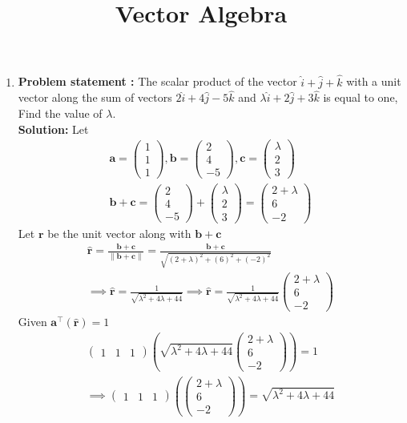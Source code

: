 \documentclass[10pt]{article}
\providecommand{\brak}[1]{\ensuremath{\left(#1\right)}}
\newcommand{\solution}{\noindent \textbf{Solution: }}
\newcommand{\myvec}[1]{\ensuremath{\begin{pmatrix}#1\end{pmatrix}}}
\providecommand{\norm}[1]{\left\lVert#1\right\rVert}
\let\vec\mathbf{}
\begin{document}
\begin{center}
\title{\textbf{Vector Algebra}}
\date{\vspace{-5ex}} %
\maketitle
\end{center}

\begin{enumerate}
\item\textbf{Problem statement :} The scalar product of the vector $\hat{i}+\hat{j}+\hat{k}$ with a unit vector along the sum of vectors $2\hat{i}+4\hat{j}-5\hat{k}$ and $\lambda\hat{i}+2\hat{j}+3\hat{k}$ is equal to one, Find the value of $\lambda$.
\\
\solution
Let
\begin{align}
\vec{a} =\myvec{1\\1\\1} , \vec{b}=\myvec{2\\4\\-5} , \vec{c}=\myvec{\lambda\\2\\3}\\
\vec{b}+\vec{c}=\myvec{2\\4\\-5}+\myvec{\lambda\\2\\3}=\myvec{2+\lambda\\6\\-2}
\end{align}
Let $\vec{r}$ be the unit vector along with $\vec{b}+\vec{c}$
\begin{align}
\hat{\vec{r}}=\frac{\vec{b}+\vec{c}}{\norm{\vec{b}+\vec{c}}}=\frac{\vec{b}+\vec{c}}{\sqrt{\brak{2+\lambda}^2+\brak{6}^2+\brak{-2}^2}}\\
\implies\hat{\vec{r}}=\frac{1}{\sqrt{\lambda^2+4\lambda+44}}
\implies\hat{\vec{r}}=\frac{1}{\sqrt{\lambda^2+4\lambda+44}}\myvec{2+\lambda\\6\\-2}
\end{align}
Given $\vec{a}^\top\brak{\vec{\hat{r}}} = 1$
\begin{align}
\myvec{1&1&1}\brak{{\sqrt{\lambda^2+4\lambda+44}}\myvec{2+\lambda\\6\\-2}}=1\\
\implies \myvec{1&1&1}\brak{\myvec{2+\lambda\\6\\-2}}={\sqrt{\lambda^2+4\lambda+44}}\\

\end{align}
\end{enumerate}
\end{document}
